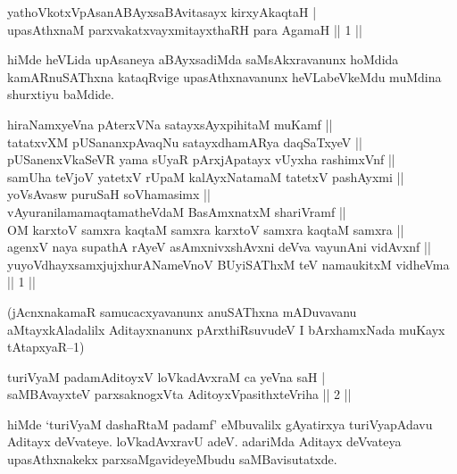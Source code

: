 \begin{shl}
yathoVkotxVpAsanABAyxsaBAvitasayx kirxyAkaqtaH | \\
upasAthxnaM parxvakatxvayxmitayxthaRH para AgamaH \hfill||  1 || 
\end{shl}

\begin{artha} 
hiMde heVLida upAsaneya aBAyxsadiMda saMsAkxravanunx hoMdida 
kamARnuSAThxna kataqRvige upasAthxnavanunx heVLabeVkeMdu muMdina 
shurxtiyu baMdide.\\
\begin{shl}
hiraNamxyeVna pAterxVNa satayxsAyxpihitaM muKamf ||\\ tatatxvXM pUSananxpAvaqNu satayxdhamARya daqSaTxyeV ||\\pUSanenxVkaSeVR yama sUyaR pArxjApatayx vUyxha rashimxVnf ||\\samUha teVjoV yatetxV rUpaM kalAyxNatamaM tatetxV pashAyxmi ||\\ yoV\s sAvasw puruSaH soV\s hamasimx ||\\ vAyuranilamamaqtamatheVdaM BasAmxnatxM shariVramf ||\\ OM karxtoV samxra kaqtaM samxra karxtoV samxra kaqtaM samxra ||\\ agenxV naya supathA rAyeV asAmxnivxshAvxni deVva vayunAni vidAvxnf ||\\ yuyoVdhayxsamxjujxhurANameVnoV BUyiSAThxM teV namaukitxM vidheVma || 1 ||
\end{shl}
(jAcnxnakamaR samucacxyavanunx anuSAThxna mADuvavanu aMtayxkAladalilx 
Aditayxnanunx pArxthiRsuvudeV I bArxhamxNada muKayx tAtapxyaR{\rm --}1)
\end{artha}


\begin{shl}
turiVyaM padamAditoyxV loVkadAvxraM ca yeVna saH | \\
saMBAvayxteV parxsaknogxV\s ta AditoyxVpasithxteVriha \hfill||  2 || 
\end{shl}

\begin{artha} 
hiMde `turiVyaM dashaRtaM padamf' eMbuvalilx gAyatirxya turiVyapAdavu 
Aditayx deVvateye. loVkadAvxravU adeV. adariMda Aditayx deVvateya 
upasAthxnakekx parxsaMgavideyeMbudu saMBavisutatxde.
\end{artha}


